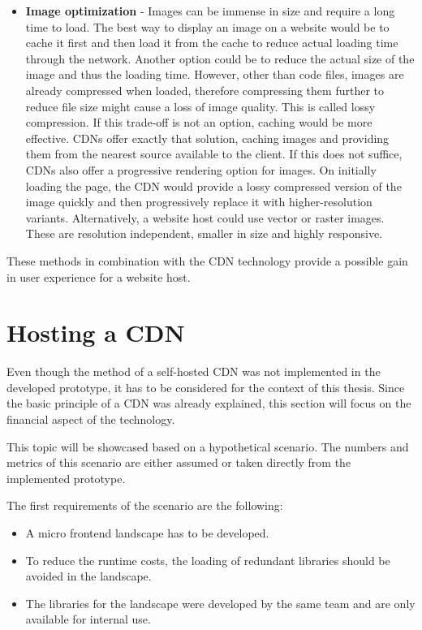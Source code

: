 \begin{itemize}
	\item \textbf{Image optimization} - Images can be immense in size and require a long time to load. The best way to display an image on a website would be to cache it first and then load it from the cache to reduce actual loading time through the network. Another option could be to reduce the actual size of the image and thus the loading time.
	However, other than code files, images are already compressed when loaded, therefore compressing them further to reduce file size might cause a loss of image quality. This is called lossy compression. If this trade-off is not an option, caching would be more effective.
	CDNs offer exactly that solution, caching images and providing them from the nearest source available to the client. If this does not suffice, CDNs also offer a progressive rendering option for images. On initially loading the page, the CDN would provide a lossy compressed version of the image quickly and then progressively replace it with higher-resolution variants.
	Alternatively, a website host could use vector or raster images. These are resolution independent, smaller in size and highly responsive.\cite{cdn_fe_opt_img_opt}
\end{itemize}

These methods in combination with the CDN technology provide a possible gain in user experience for a website host. \cite{cdn_fe_opt}

\section{Hosting a CDN}

Even though the method of a self-hosted CDN was not implemented in the developed prototype, it has to be considered for the context of this thesis. Since the basic principle of a CDN was already explained, this section will focus on the financial aspect of the technology.

This topic will be showcased based on a hypothetical scenario. The numbers and metrics of this scenario are either assumed or taken directly from the implemented prototype.

The first requirements of the scenario are the following:

\begin{itemize}[noitemsep]
	\item A micro frontend landscape has to be developed. 
	\item To reduce the runtime costs, the loading of redundant libraries should be avoided in the landscape.
	\item The libraries for the landscape were developed by the same team and are only available for internal use.
\end{itemize} 

